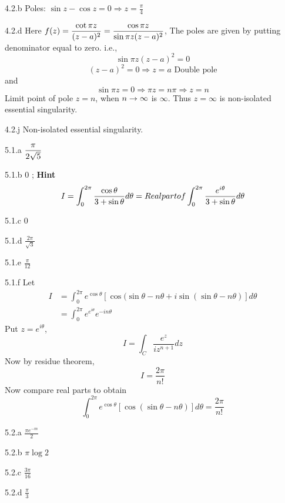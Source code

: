 \begin{Solution}{4.2.b}
	Poles: $\sin z - \cos z=0 \Rightarrow z=\frac{\pi}{4}$
	
\end{Solution}
\begin{Solution}{4.2.d}
	Here $\displaystyle f(z)=\frac{\cot \pi z}{(z-a)^2}=\frac{\cos \pi z}{\sin \pi z(z-a)^2}$, The poles are given by putting denominator equal to zero. i.e.,
	\[\sin \pi z(z-a)^2 = 0\]
	\[(z-a)^2 = 0 \Rightarrow z=a \text{ Double pole}\]
	and
	\[\sin \pi z = 0 \Rightarrow \pi z = n\pi \Rightarrow z=n\]
	Limit point of pole $z=n$, when $n\rightarrow \infty$ is $\infty$. Thus $z=\infty$ is non-isolated essential singularity.
	
\end{Solution}
\begin{Solution}{4.2.j}
	Non-isolated essential singularity.
	
\end{Solution}
\begin{Solution}{5.1.a}
	$\displaystyle \frac{\pi}{2\sqrt{5}}$
	
\end{Solution}
\begin{Solution}{5.1.b}
	0 ; \textbf{Hint}
	\[I = \int_0^{2\pi}{\cos \theta \over 3+\sin\theta} d\theta = Real part of \int_0^{2\pi}{\frac{e^{i\theta}}{3+\sin\theta}} d\theta \]
	
\end{Solution}
\begin{Solution}{5.1.c}
	0
	
\end{Solution}
\begin{Solution}{5.1.d}
	$\frac{2\pi}{\sqrt{3}}$
	
\end{Solution}
\begin{Solution}{5.1.e}
	$\frac{\pi}{12}$
	
\end{Solution}
\begin{Solution}{5.1.f}
	Let
	\begin{align*}
	I &=\int_0^{2\pi} e^{\cos \theta}[\cos(\sin \theta - n \theta+ i\sin(\sin \theta - n \theta)]d\theta \\
		&= \int_0^{2\pi}e^{e^{i\theta}}e^{-in\theta}
\end{align*}
	Put $z=e^{i\theta}$,
	\[I = \int_C \frac{e^z}{iz^{n+1}}dz\]
	Now by residue theorem,
	\[I = \frac{2\pi}{n!}\]
	Now compare real parts to obtain
	\[\int_0^{2\pi} e^{\cos \theta}[\cos(\sin \theta - n \theta)]d\theta = \frac{2\pi}{n!}\]

	
\end{Solution}
\begin{Solution}{5.2.a}
$\frac{\pi e^{-m}}{2}$
\end{Solution}
\begin{Solution}{5.2.b}
$\pi \log 2$
\end{Solution}
\begin{Solution}{5.2.c}
$\frac{3\pi}{16}$
\end{Solution}
\begin{Solution}{5.2.d}
$\frac{\pi}{3}$
\end{Solution}
